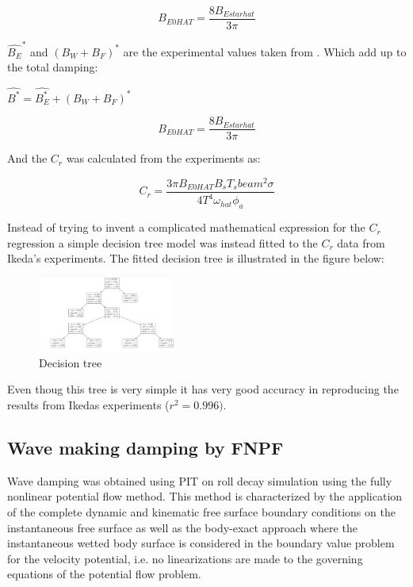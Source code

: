 \begin{equation}
B_{E0 HAT} = \frac{8 B_{E star hat}}{3 \pi}
\label{eq:equation}
\end{equation}

    
$\hat{B_E}^*$ and $(B_W+B_F)^*$ are the experimental values taken from \cite{7505983/4AFVVGNT}. Which add up to the total damping: 

$\hat{B^*} = \hat{B^*_E} + (B_W+B_F)^*$
 
\begin{equation}
B_{E0 HAT} = \frac{8 B_{E star hat}}{3 \pi}
\label{eq:equation}
\end{equation}

    
And the $C_r$ was calculated from the experiments as:

    
\begin{equation}
C_{r} = \frac{3 \pi B_{E0 HAT} B_{s} T_{s} beam^{2} \sigma}{4 T^{4} \omega_{hat} \phi_{a}}
\label{eq:equation}
\end{equation}

    

Instead of trying to invent a complicated mathematical expression for the $C_r$ regression a simple decision tree model was instead fitted to the $C_r$ data from Ikeda's experiments. The fitted decision tree is illustrated in the figure below:

    \begin{figure}
        \begin{center}\includegraphics[width = 0.4\textwidth]{figures/decision_tree.pdf}\end{center}
        \vspace{-0.5cm}
        \caption{Decision tree}
        \label{fig:decision_tree}
    \end{figure}
    
Even thoug this tree is very simple it has very good accuracy in reproducing the results from Ikedas experiments ($r^2=0.996)$.

\subsection*{\textbf{Wave making damping by FNPF}} \label{subsec:hybrid_FNPF}
Wave damping was obtained using PIT on roll decay
simulation using the fully nonlinear potential flow method. This method is characterized by the application of the complete dynamic and kinematic free surface boundary conditions on the instantaneous free surface as well as the body-exact approach where the instantaneous wetted body surface is considered in the boundary value problem for the velocity potential, i.e. no linearizations are made to the governing equations of the potential flow problem.

